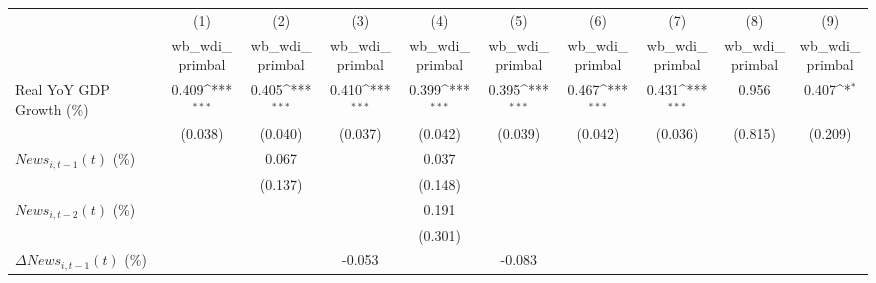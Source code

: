 {
\def\sym#1{\ifmmode^{#1}\else\(^{#1}\)\fi}
\begin{tabular}{l*{9}{c}}
\toprule
                    &\multicolumn{1}{c}{(1)}&\multicolumn{1}{c}{(2)}&\multicolumn{1}{c}{(3)}&\multicolumn{1}{c}{(4)}&\multicolumn{1}{c}{(5)}&\multicolumn{1}{c}{(6)}&\multicolumn{1}{c}{(7)}&\multicolumn{1}{c}{(8)}&\multicolumn{1}{c}{(9)}\\
                    &\multicolumn{1}{c}{wb_wdi_primbal}&\multicolumn{1}{c}{wb_wdi_primbal}&\multicolumn{1}{c}{wb_wdi_primbal}&\multicolumn{1}{c}{wb_wdi_primbal}&\multicolumn{1}{c}{wb_wdi_primbal}&\multicolumn{1}{c}{wb_wdi_primbal}&\multicolumn{1}{c}{wb_wdi_primbal}&\multicolumn{1}{c}{wb_wdi_primbal}&\multicolumn{1}{c}{wb_wdi_primbal}\\
\midrule
Real YoY GDP Growth (\%)&       0.409\sym{***}&       0.405\sym{***}&       0.410\sym{***}&       0.399\sym{***}&       0.395\sym{***}&       0.467\sym{***}&       0.431\sym{***}&       0.956         &       0.407\sym{*}  \\
                    &     (0.038)         &     (0.040)         &     (0.037)         &     (0.042)         &     (0.039)         &     (0.042)         &     (0.036)         &     (0.815)         &     (0.209)         \\
\addlinespace
$ News_{i,t-1}(t)$ (\%)&                     &       0.067         &                     &       0.037         &                     &                     &                     &                     &                     \\
                    &                     &     (0.137)         &                     &     (0.148)         &                     &                     &                     &                     &                     \\
\addlinespace
$ News_{i,t-2}(t)$ (\%)&                     &                     &                     &       0.191         &                     &                     &                     &                     &                     \\
                    &                     &                     &                     &     (0.301)         &                     &                     &                     &                     &                     \\
\addlinespace
$ \Delta News_{i,t-1}(t)$ (\%)&                     &                     &      -0.053         &                     &      -0.083         &                     &                     &                     &                     \\

\end{tabular}}
